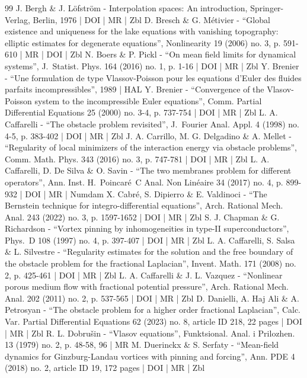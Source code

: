 \begin{thebibliography}{99}
J. Bergh \& J. Löfström - Interpolation spaces: An introduction, Springer-Verlag, Berlin, 1976 | DOI | MR | Zbl
D. Bresch \& G. Métivier - “Global existence and uniqueness for the lake equations with vanishing topography: elliptic estimates for degenerate equations”, Nonlinearity 19 (2006) no. 3, p. 591-610 | MR | DOI | Zbl
N. Boers \& P. Pickl - “On mean field limits for dynamical systems”, J. Statist. Phys. 164 (2016) no. 1, p. 1-16 | DOI | MR | Zbl
Y. Brenier - “Une formulation de type Vlassov-Poisson pour les equations d’Euler des fluides parfaits incompressibles”, 1989 | HAL
Y. Brenier - “Convergence of the Vlasov-Poisson system to the incompressible Euler equations”, Comm. Partial Differential Equations 25 (2000) no. 3-4, p. 737-754 | DOI | MR | Zbl
L. A. Caffarelli - “The obstacle problem revisited”, J. Fourier Anal. Appl. 4 (1998) no. 4-5, p. 383-402 | DOI | MR | Zbl
J. A. Carrillo, M. G. Delgadino \& A. Mellet - “Regularity of local minimizers of the interaction energy via obstacle problems”, Comm. Math. Phys. 343 (2016) no. 3, p. 747-781 | DOI | MR | Zbl
L. A. Caffarelli, D. De Silva \& O. Savin - “The two membranes problem for different operators”, Ann. Inst. H. Poincaré C Anal. Non Linéaire 34 (2017) no. 4, p. 899-932 | DOI | MR | Numdam
X. Cabré, S. Dipierro \& E. Valdinoci - “The Bernstein technique for integro-differential equations”, Arch. Rational Mech. Anal. 243 (2022) no. 3, p. 1597-1652 | DOI | MR | Zbl
S. J. Chapman \& G. Richardson - “Vortex pinning by inhomogeneities in type-II superconductors”, Phys. D 108 (1997) no. 4, p. 397-407 | DOI | MR | Zbl
L. A. Caffarelli, S. Salsa \& L. Silvestre - “Regularity estimates for the solution and the free boundary of the obstacle problem for the fractional Laplacian”, Invent. Math. 171 (2008) no. 2, p. 425-461 | DOI | MR | Zbl
L. A. Caffarelli \& J. L. Vazquez - “Nonlinear porous medium flow with fractional potential pressure”, Arch. Rational Mech. Anal. 202 (2011) no. 2, p. 537-565 | DOI | MR | Zbl
D. Danielli, A. Haj Ali \& A. Petrosyan - “The obstacle problem for a higher order fractional Laplacian”, Calc. Var. Partial Differential Equations 62 (2023) no. 8, article ID 218, 22 pages | DOI | MR | Zbl
R. L. Dobrušin - “Vlasov equations”, Funktsional. Anal. i Prilozhen. 13 (1979) no. 2, p. 48-58, 96 | MR
M. Duerinckx \& S. Serfaty - “Mean-field dynamics for Ginzburg-Landau vortices with pinning and forcing”, Ann. PDE 4 (2018) no. 2, article ID 19, 172 pages | DOI | MR | Zbl

\end{thebibliography}

